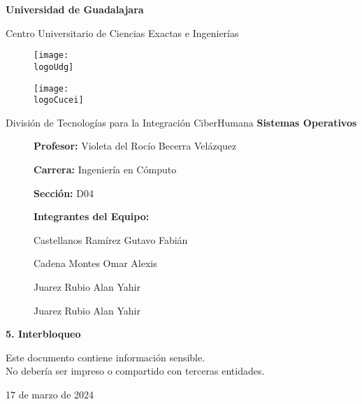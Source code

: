 \documentclass[12pt, a4paper]{article} %
\title{\theTitle}
\author{\theAuthor}
\newcommand{\logoUdg}{../../../../attachments/images/portada-udg.jpeg}
\newcommand{\logoCucei}{../../../../attachments/images/portada-cucei.jpeg}
\newcommand{\materia}{Sistemas Operativos}
\newcommand{\theTitle}{5. Interbloqueo}
\newcommand{\profesor}{Violeta del Rocío Becerra Velázquez}
\newcommand{\carrera}{Ingeniería en Cómputo}
\newcommand{\seccion}{D04}
\newcommand{\startDate}{17 de marzo de 2024}
\newcommand{\aAuthor}{Castellanos Ramírez Gutavo Fabián}
\newcommand{\bAuthor}{Cadena Montes Omar Alexis}
\newcommand{\cAuthor}{Juarez Rubio Alan Yahir}
\newcommand{\theAuthor}{\cAuthor}
\newcommand{\nl}{\par\vspace{0.4cm}}
\begin{document}
\cfoot{\ifodd\value{page}\else\thepage\fi} %

\begin{titlepage}
	\centering
	{\huge\textbf{Universidad de Guadalajara}}\par\vspace{0.6cm}
	{\LARGE{Centro Universitario de Ciencias Exactas e Ingenierías}}\vfill
	
	\begin{figure}[h]
		\begin{minipage}[t]{0.45\textwidth}
			\centering
			\texttt{[image: \\logoUdg]}
		\end{minipage}
		\hfill
		\begin{minipage}[t]{0.45\textwidth}
			\centering
			\texttt{[image: \\logoCucei]}
		\end{minipage}
	\end{figure}\vfill
	
	{\Large{División de Tecnologías para la Integración CiberHumana}}\vfill\vfill
	{\Large\textbf{\materia}}\vfill
	\begin{figure}[h]
		\centering
		\begin{minipage}[t]{0.75\textwidth}
			{\Large
				\textbf{Profesor:} \profesor\nl
				\textbf{Carrera:} \carrera\nl
				\textbf{Sección:} \seccion
			}
		\end{minipage}
	\end{figure}\vfill
	
	\begin{figure}[h]
		\centering
		\begin{minipage}[t]{0.75\textwidth}
			\centering
			{\Large \textbf{Integrantes del Equipo:}}\nl
			{\large
				\aAuthor\nl
				\bAuthor\nl
				\theAuthor\nl
				\cAuthor\nl
			}
		\end{minipage}
	\end{figure}

	{\LARGE{\textbf{\theTitle}}}\vfill
	
	\begin{tcolorbox}[colback=red!5!white, colframe=red!75!black]
		\centering
		Este documento contiene información sensible.\\
		No debería ser impreso o compartido con terceras entidades.
	\end{tcolorbox}\vfill
	{\large \startDate}\par
\end{titlepage}
\end{document}
